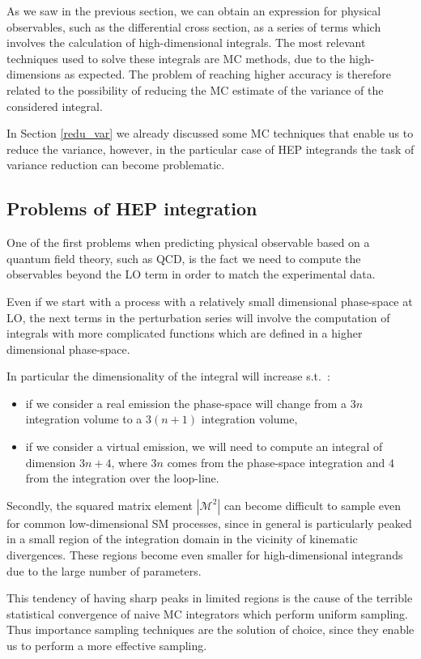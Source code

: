 \documentclass[../main/main.tex]{subfiles}
\begin{document}
As we saw in the previous section, we can obtain an expression for physical observables, such as the differential cross section, as a series of terms which involves the calculation of high-dimensional integrals. The most relevant techniques used to solve these integrals are MC methods, due to the high-dimensions as expected. The problem of reaching higher accuracy is therefore related 
to the possibility of reducing the MC estimate of the variance of the considered integral.

In Section \ref{redu_var} we already discussed some MC techniques that enable us to reduce the variance, however, in the particular case of HEP integrands the task of variance reduction can become problematic.

\subsection{Problems of HEP integration}
One of the first problems when predicting physical observable based on a quantum field theory, such as QCD, is the fact we need to compute the observables beyond the LO term in order to match the experimental data. 

Even if we start with a process with a relatively small dimensional phase-space  at LO, the next terms in the perturbation series will involve the computation of integrals with more complicated functions which are defined in a higher dimensional phase-space.

In particular the dimensionality of the integral will increase s.t.\ :
\begin{itemize}
	\item if we consider a real emission  the phase-space will change from a $3 n$ integration volume to a $3(n+1)$ integration volume,
	\item if we consider a virtual emission, we will need to compute an integral of dimension $3n +4$, where $3n$ comes from the phase-space integration and $4$ from the integration over the loop-line.
\end{itemize}

Secondly, the squared matrix element $|\mathcal{M}^2|$ can become difficult to sample even for common low-dimensional SM processes, since 
in general is particularly peaked in a small region of the integration domain in the vicinity of kinematic divergences. These regions become even smaller for high-dimensional integrands due to the large number of parameters.

This tendency of having sharp peaks in limited regions is the cause of the terrible statistical convergence of naive MC integrators which 
perform uniform sampling. Thus importance sampling techniques are the solution of choice, since they enable us to perform a more effective 
sampling.
\end{document}

